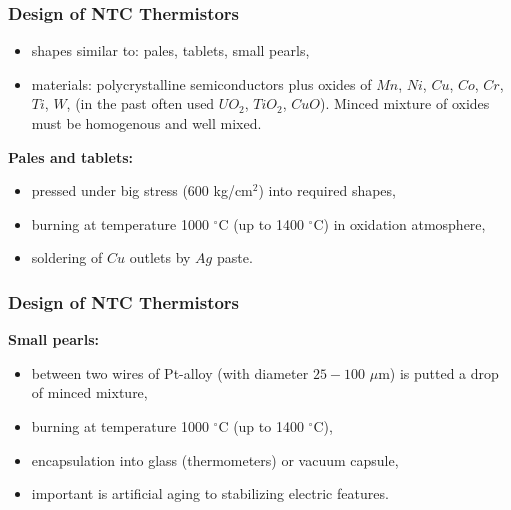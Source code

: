 \documentclass{beamer}
\begin{document}
	\begin{frame}
    \frametitle{Design of NTC Thermistors}
		\small
		\begin{itemize}
			\item shapes similar to: pales, tablets, small pearls,
			\item materials: polycrystalline semiconductors plus oxides of $Mn$, $Ni$, $Cu$, $Co$, $Cr$, $Ti$, $W$, (in the past often used $UO_2$, $TiO_2$, $CuO$). Minced mixture of oxides must be homogenous and well mixed.
		\end{itemize}
		\textbf{Pales and tablets:}
		\begin{itemize}
			\item pressed under big stress (600 kg/cm$^2$) into required shapes,
			\item burning at temperature 1000 $^\circ$C (up to 1400 $^\circ$C) in oxidation atmosphere,
			\item soldering of $Cu$ outlets by $Ag$ paste.
		\end{itemize}
  \end{frame}
	\begin{frame}
    \frametitle{Design of NTC Thermistors}
		\small
		\textbf{Small pearls:}
		\begin{itemize}
			\item between two wires of Pt-alloy (with diameter $25 - 100$ $\mu$m) is putted a drop of minced mixture,
			\item burning at temperature 1000 $^\circ$C (up to 1400 $^\circ$C),
			\item encapsulation into glass (thermometers) or vacuum capsule,
			\item important is artificial aging to stabilizing electric features.
		\end{itemize}
  \end{frame}
\end{document}
